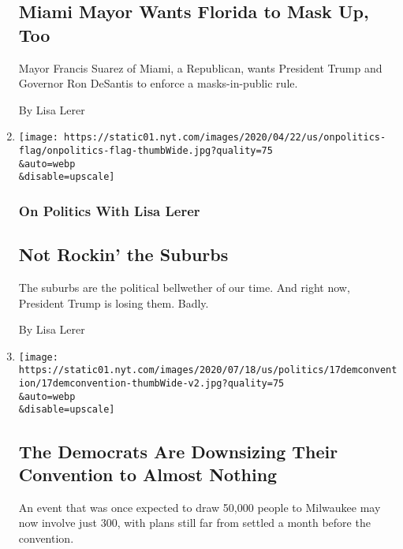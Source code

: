 \begin{enumerate}
  \hypertarget{miami-mayor-wants-florida-to-mask-up-too}{%
  \subsection{Miami Mayor Wants Florida to Mask Up,
  Too}\label{miami-mayor-wants-florida-to-mask-up-too}}

  Mayor Francis Suarez of Miami, a Republican, wants President Trump and
  Governor Ron DeSantis to enforce a masks-in-public rule.

  By Lisa Lerer
\item
  \href{/2020/07/20/us/politics/trump-suburbs.html}{}

  \texttt{[image: https://static01.nyt.com/images/2020/04/22/us/onpolitics-flag/onpolitics-flag-thumbWide.jpg?quality=75\\\&auto=webp\\\&disable=upscale]}

  \hypertarget{on-politics-with-lisa-lerer-5}{%
  \subsubsection{On Politics With Lisa
  Lerer}\label{on-politics-with-lisa-lerer-5}}

  \hypertarget{not-rockin-the-suburbs}{%
  \subsection{Not Rockin' the Suburbs}\label{not-rockin-the-suburbs}}

  The suburbs are the political bellwether of our time. And right now,
  President Trump is losing them. Badly.

  By Lisa Lerer
\item
  \href{/2020/07/17/us/politics/democratic-convention-milwaukee.html}{}

  \texttt{[image: https://static01.nyt.com/images/2020/07/18/us/politics/17demconvention/17demconvention-thumbWide-v2.jpg?quality=75\\\&auto=webp\\\&disable=upscale]}

  \hypertarget{the-democrats-are-downsizing-their-convention-to-almost-nothing}{%
  \subsection{The Democrats Are Downsizing Their Convention to Almost
  Nothing}\label{the-democrats-are-downsizing-their-convention-to-almost-nothing}}

  An event that was once expected to draw 50,000 people to Milwaukee may
  now involve just 300, with plans still far from settled a month before
  the convention.


\end{enumerate}
